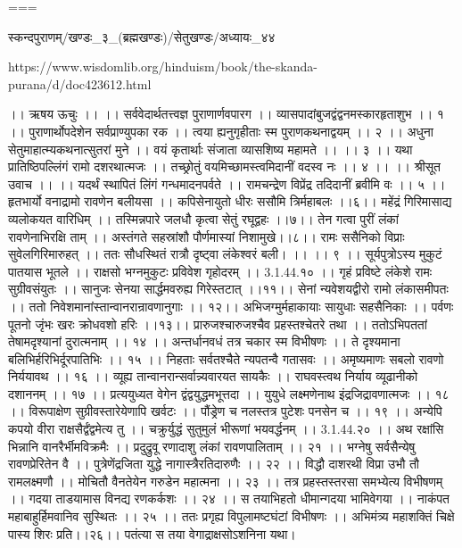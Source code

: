 ===

स्कन्दपुराणम्/खण्डः_३_(ब्रह्मखण्डः)/सेतुखण्डः/अध्यायः_४४

https://www.wisdomlib.org/hinduism/book/the-skanda-purana/d/doc423612.html

।। ऋषय ऊचुः ।। ।।
सर्ववेदार्थतत्त्वज्ञ पुराणार्णवपारग ।।
व्यासपादांबुजद्वंद्वनमस्कारहृताशुभ ।। १ ।।
पुराणार्थोपदेशेन सर्वप्राण्युपका रक ।।
त्वया ह्यनुगृहीताः स्म पुराणकथनाद्वयम् ।। २ ।।
अधुना सेतुमाहात्म्यकथनात्सुतरां मुने ।।
वयं कृतार्थाः संजाता व्यासशिष्य महामते ।। ।। ३ ।।
यथा प्रातिष्ठिपल्लिंगं रामो दशरथात्मजः ।।
तच्छ्रोतुं वयमिच्छामस्त्वमिदानीं वदस्व नः ।। ४ ।।
।। श्रीसूत उवाच ।। ।।
यदर्थं स्थापितं लिंगं गन्धमादनपर्वते ।।
रामचन्द्रेण विप्रेंद्र तदिदानीं ब्रवीमि वः ।। ५ ।।
हृतभार्यो वनाद्रामो रावणेन बलीयसा ।।
कपिसेनायुतो धीरः ससौमि त्रिर्महाबलः ।।६।।
महेंद्रं गिरिमासाद्य व्यलोकयत वारिधिम् ।।
तस्मिन्नपारे जलधौ कृत्वा सेतुं रघूद्वहः ।।७।।
तेन गत्वा पुरीं लंकां रावणेनाभिरक्षि ताम् ।।
अस्तंगते सहस्रांशौ पौर्णमास्यां निशामुखे।।८।।
रामः ससैनिको विप्राः सुवेलगिरिमारुहत् ।।
ततः सौधस्थितं रात्रौ दृष्ट्वा लंकेश्वरं बली। ।। ।। ९ ।।
सूर्यपुत्रोऽस्य मुकुटं पातयास भूतले ।।
राक्षसो भग्नमुकुटः प्रविवेश गृहोदरम् ।। 3.1.44.१० ।।
गृहं प्रविष्टे लंकेशे रामः सुग्रीवसंयुतः ।।
सानुजः सेनया सार्द्धमवरुह्य गिरेस्तटात् ।।११।।
सेनां न्यवेशयद्वीरो रामो लंकासमीपतः ।।
ततो निवेशमानांस्तान्वानरान्रावणानुगाः ।। १२।।
अभिजग्मुर्महाकायाः सायुधाः सहसैनिकाः ।।
पर्वणः पूतनो जृंभः खरः क्रोधवशो हरिः ।।१३।।
प्रारुजश्चारुजश्चैव प्रहस्तश्चेतरे तथा ।।
ततोऽभिपततां तेषामदृश्यानां दुरात्मनाम् ।। १४ ।।
अन्तर्धानवधं तत्र चकार स्म विभीषणः ।।
ते दृश्यमाना बलिभिर्हरिभिर्दूरपातिभिः ।। १५ ।।
निहताः सर्वतश्चैते न्यपतन्वै गतासवः ।।
अमृष्यमाणः सबलो रावणो निर्ययावथ ।। १६ ।।
व्यूह्य तान्वानरान्सर्वान्न्यवारयत सायकैः ।।
राघवस्त्वथ निर्याय व्यूढानीको दशाननम् ।। १७ ।।
प्रत्ययुध्यत वेगेन द्वंद्वयुद्धमभूत्तदा ।।
युयुधे लक्ष्मणेनाथ इंद्रजिद्रावणात्मजः ।। १८ ।।
विरूपाक्षेण सुग्रीवस्तारेयेणापि खर्वटः ।।
पौंड्रेण च नलस्तत्र पुटेशः पनसेन च ।। १९ ।।
अन्येपि कपयो वीरा राक्षसैर्द्वंद्वमेत्य तु ।।
चक्रुर्युद्धं सुतुमुलं भीरूणां भयवर्द्धनम् ।। 3.1.44.२० ।।
अथ रक्षांसि भिन्नानि वानरैर्भीमविक्रमैः ।।
प्रदुद्रुवू रणादाशु लंकां रावणपालिताम् ।। २१ ।।
भग्नेषु सर्वसैन्येषु रावणप्रेरितेन वै ।।
पुत्रेणेंद्रजिता युद्धे नागास्त्रैरतिदारुणैः ।। २२ ।।
विद्धौ दाशरथी विप्रा उभौ तौ रामलक्ष्मणौ ।।
मोचितौ वैनतेयेन गरुडेन महात्मना ।। २३ ।।
तत्र प्रहस्तस्तरसा समभ्येत्य विभीषणम् ।।
गदया ताडयामास विनद्य रणकर्कशः ।। २४ ।।
स तयाभिहतो धीमान्गदया भामिवेगया ।।
नाकंपत महाबाहुर्हिमवानिव सुस्थितः ।। २५ ।।
ततः प्रगृह्य विपुलामष्टघंटां विभीषणः ।।
अभिमंत्र्य महाशक्तिं चिक्षे पास्य शिरः प्रति।।२६।।
पतंत्या स तया वेगाद्राक्षसोऽशनिना यथा।

